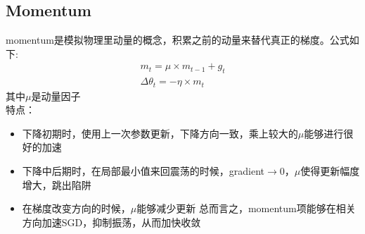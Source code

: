 \documentclass[hyperref, UTF-8]{ctexart}
\begin{document}
\subsection{Momentum}
momentum是模拟物理里动量的概念，积累之前的动量来替代真正的梯度。公式如下:
\begin{eqnarray*}
  m_t = \mu \times m_{t-1} + g_t  \\
  \Delta\theta_t = -\eta \times m_t
\end{eqnarray*}
其中$\mu$是动量因子 \\
特点：
\begin{itemize}
\item 下降初期时，使用上一次参数更新，下降方向一致，乘上较大的$\mu$能够进行很好的加速
\item 下降中后期时，在局部最小值来回震荡的时候，gradient$\to$0，$\mu$使得更新幅度增大，跳出陷阱
\item 在梯度改变方向的时候，$\mu$能够减少更新 总而言之，momentum项能够在相关方向加速SGD，抑制振荡，从而加快收敛
\end{itemize}
\end{document}
